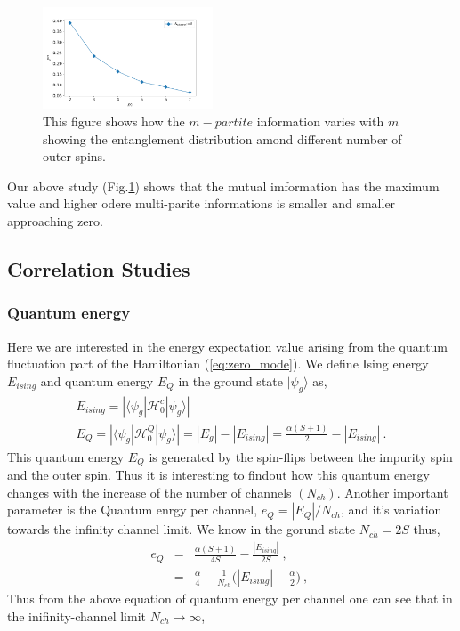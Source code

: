 \documentclass[reprint,prb,superscriptaddress]{revtex4-2}
\begin{document}
\begin{figure}
\includegraphics[width=0.45\textwidth]{plt/I_N_vs_N_N9.png}
\caption{This figure shows how the $m-partite$ information varies with $m$ showing the entanglement distribution amond different number of outer-spins.}
\label{fig:Im_vs_m}
\end{figure}
\noindent Our above study (Fig.\ref{fig:Im_vs_m}) shows that the mutual imformation has the maximum value and higher odere multi-parite informations is smaller and smaller approaching zero.

\subsection{Correlation Studies}

\subsubsection{Quantum energy}
\noindent Here we are interested in the energy expectation value arising from the quantum fluctuation part of the Hamiltonian (\ref{eq:zero_mode}). We define Ising energy $E_{ising}$ and quantum energy $E_{Q}$ in the ground state $|\psi_g\rangle$ as,
\begin{gather}
	E_{ising} = |\langle \psi_g | \mathcal{H}^c_0 | \psi_g \rangle| \\
E_{Q} = |\langle \psi_g | \mathcal{H}^Q_0 | \psi_g \rangle|=|E_g|-|E_{ising}| = \frac{\alpha(S+1)}{2} - |E_{ising}|~.
\end{gather}  
This quantum energy $E_Q$ is generated by the spin-flips between the impurity spin and the outer spin. Thus it is interesting to findout how this quantum energy changes with the increase of the number of channels $(N_{ch})$. Another important parameter is the Quantum enrgy per channel, $e_Q=|E_Q|/N_{ch}$, and it's variation towards the infinity channel limit. We know in the gorund state $N_{ch}=2S$ thus,
\begin{eqnarray}
e_Q &=& \frac{\alpha(S+1)}{4S} - \frac{|E_{ising}|}{2S} ~,~\nonumber\\
&=& \frac{\alpha}{4} -\frac{1}{N_{ch}} \bigg(|E_{ising}| -\frac{\alpha}{2}  \bigg)~,~
\end{eqnarray}
Thus from the above equation of quantum energy per channel one can see that in the inifinity-channel limit $N_{ch}\rightarrow \infty$, 
\end{document}
